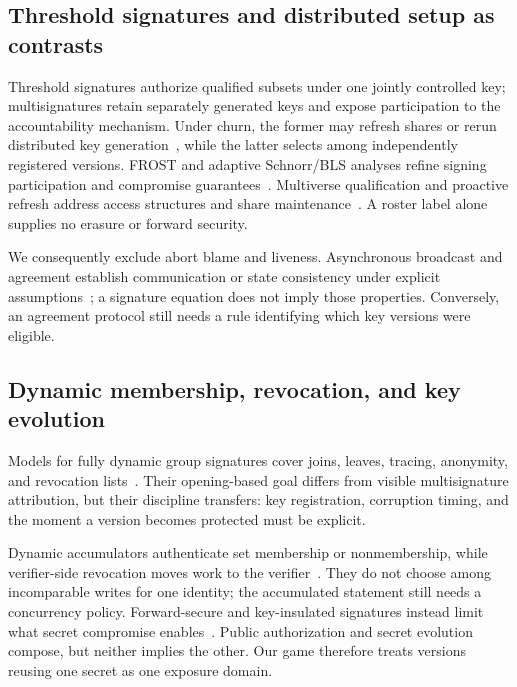 \documentclass[11pt]{article}
\theoremstyle{definition}
\begin{document}
\subsection{Threshold signatures and distributed setup as contrasts}
Threshold signatures authorize qualified subsets under one jointly controlled key; multisignatures retain separately generated keys and expose participation to the accountability mechanism.  Under churn, the former may refresh shares or rerun distributed key generation~\cite{gennaro1999dkg,canny2004dkg,groth2021dkg}, while the latter selects among independently registered versions.  FROST and adaptive Schnorr/BLS analyses refine signing participation and compromise guarantees~\cite{komlo2021frost,crites2023adaptive,bacho2022threshold}. Multiverse qualification and proactive refresh address access structures and share maintenance~\cite{baird2023multiverse,boneh2022proactive}.  A roster label alone supplies no erasure or forward security.

We consequently exclude abort blame and liveness.  Asynchronous broadcast and agreement establish communication or state consistency under explicit assumptions~\cite{cachin2001secure,cachin2000constantinople,reiter1996secure}; a signature equation does not imply those properties.  Conversely, an agreement protocol still needs a rule identifying which key versions were eligible.

\subsection{Dynamic membership, revocation, and key evolution}
Models for fully dynamic group signatures cover joins, leaves, tracing, anonymity, and revocation lists~\cite{bootle2020dynamic}.  Their opening-based goal differs from visible multisignature attribution, but their discipline transfers: key registration, corruption timing, and the moment a version becomes protected must be explicit.

Dynamic accumulators authenticate set membership or nonmembership, while verifier-side revocation moves work to the verifier~\cite{camenisch2002accumulator,nguyen2005accumulator,boneh2004vlr}.  They do not choose among incomparable writes for one identity; the accumulated statement still needs a concurrency policy.  Forward-secure and key-insulated signatures instead limit what secret compromise enables~\cite{bellare1999forward,itkis2001forward,dodis2002keyinsulated}.  Public authorization and secret evolution compose, but neither implies the other.  Our game therefore treats versions reusing one secret as one exposure domain.
\end{document}
